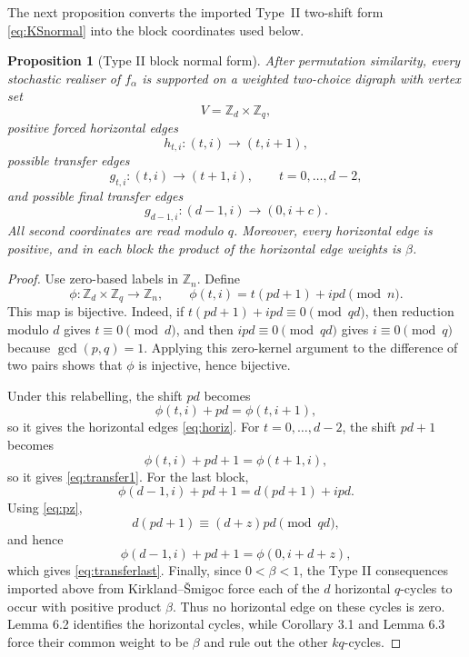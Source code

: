 \documentclass[11pt]{article}
\newtheorem{proposition}[theorem]{Proposition}
\theoremstyle{definition}
\theoremstyle{remark}
\begin{document}
The next proposition converts the imported Type~II two-shift form \eqref{eq:KSnormal} into the block coordinates used below.

\begin{proposition}[Type II block normal form]
\label{prop:blocknormal}
After permutation similarity, every stochastic realiser of $f_\alpha$ is supported on a weighted two-choice digraph with vertex set
\[
        V=\mathbb Z_d\times\mathbb Z_q,
\]
positive forced horizontal edges
\begin{equation}
        h_{t,i}:(t,i)\longrightarrow(t,i+1),
        \label{eq:horiz}
\end{equation}
possible transfer edges
\begin{equation}
        g_{t,i}:(t,i)\longrightarrow(t+1,i),
        \qquad t=0,\ldots,d-2,
        \label{eq:transfer1}
\end{equation}
and possible final transfer edges
\begin{equation}
        g_{d-1,i}:(d-1,i)\longrightarrow(0,i+c).
        \label{eq:transferlast}
\end{equation}
All second coordinates are read modulo $q$.  Moreover, every horizontal
edge is positive, and in each block the product of the horizontal edge
weights is $\beta$.
\end{proposition}

\begin{proof}
Use zero-based labels in $\mathbb Z_n$.  Define
\[
        \phi:\mathbb Z_d\times\mathbb Z_q\longrightarrow\mathbb Z_n,
        \qquad
        \phi(t,i)=t(pd+1)+ipd \pmod n .
\]
This map is bijective.  Indeed, if $t(pd+1)+ipd\equiv 0\pmod {qd}$, then reduction modulo $d$ gives $t\equiv0\pmod d$, and then $ipd\equiv0\pmod {qd}$ gives $i\equiv0\pmod q$ because $\gcd(p,q)=1$.  Applying this zero-kernel argument to the difference of two pairs shows that $\phi$ is injective, hence bijective.

Under this relabelling, the shift $pd$ becomes
\[
        \phi(t,i)+pd=\phi(t,i+1),
\]
so it gives the horizontal edges \eqref{eq:horiz}.  For $t=0,\ldots,d-2$, the shift $pd+1$ becomes
\[
        \phi(t,i)+pd+1=\phi(t+1,i),
\]
so it gives \eqref{eq:transfer1}.  For the last block,
\[
        \phi(d-1,i)+pd+1=d(pd+1)+ipd .
\]
Using \eqref{eq:pz},
\[
        d(pd+1)\equiv (d+z)pd\pmod {qd},
\]
and hence
\[
        \phi(d-1,i)+pd+1=\phi(0,i+d+z),
\]
which gives \eqref{eq:transferlast}.  Finally, since $0<\beta<1$, the Type II consequences imported above from
Kirkland--\v Smigoc force each of the $d$ horizontal $q$-cycles to occur
with positive product $\beta$.  Thus no horizontal edge on these cycles is
zero.  Lemma 6.2 identifies the horizontal cycles, while Corollary 3.1 and
Lemma 6.3 force their common weight to be $\beta$ and rule out the other
$kq$-cycles.
\end{proof}
\end{document}
